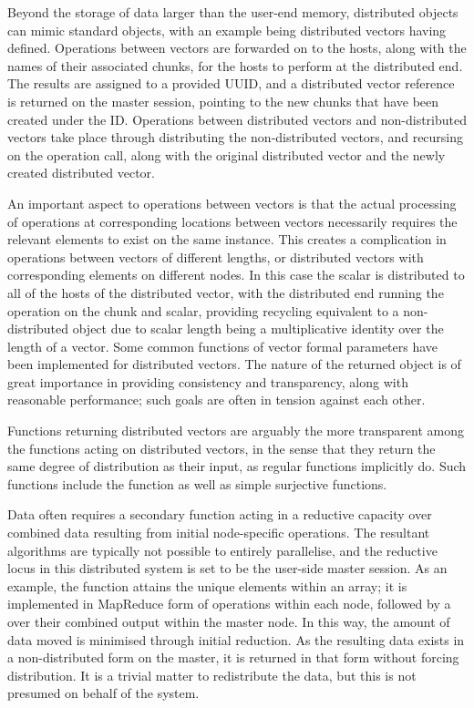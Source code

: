 Beyond the storage of data larger than the user-end memory, distributed objects can mimic standard \R{} objects, with an example being distributed vectors having  defined.
Operations between vectors are forwarded on to the hosts, along with the names of their associated chunks, for the hosts to perform at the distributed end.
The results are assigned to a provided UUID, and a distributed vector reference is returned on the master session, pointing to the new chunks that have been created under the ID.
Operations between distributed vectors and non-distributed vectors take place through distributing the non-distributed vectors, and recursing on the operation call, along with the original distributed vector and the newly created distributed vector.

An important aspect to operations between vectors is that the actual processing of operations at corresponding locations between vectors necessarily requires the relevant elements to exist on the same  instance.
This creates a complication in operations between vectors of different lengths, or distributed vectors with corresponding elements on different nodes.
In this case the scalar is distributed to all of the hosts of the distributed vector, with the distributed end running the operation on the chunk and scalar, providing recycling equivalent to a non-distributed object due to scalar length being a multiplicative identity over the length of a vector.
Some common functions of vector formal parameters have been implemented for distributed vectors.
The nature of the returned object is of great importance in providing consistency and transparency, along with reasonable performance; such goals are often in tension against each other.

Functions returning distributed vectors are arguably the more transparent among the functions acting on distributed vectors, in the sense that they return the same degree of distribution as their input, as regular \R{} functions implicitly do.
Such functions include the  function as well as simple surjective functions.

Data often requires a secondary function acting in a reductive capacity over combined data resulting from initial node-specific operations.
The resultant algorithms are typically not possible to entirely parallelise, and the reductive locus in this distributed system is set to be the user-side master \R{} session.
As an example, the  function attains the unique elements within an array; it is implemented in MapReduce form of  operations within each node, followed by a  over their combined output within the master node.
In this way, the amount of data moved is minimised through initial reduction.
As the resulting data exists in a non-distributed form on the master, it is returned in that form without forcing distribution.
It is a trivial matter to redistribute the data, but this is not presumed on behalf of the system.

